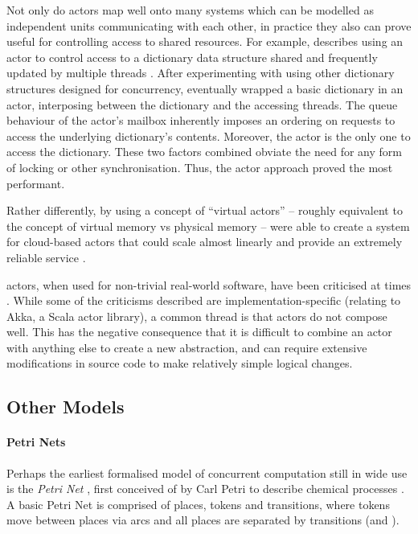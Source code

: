 Not only do \glspl{actor} map well onto many systems which can be modelled as independent units communicating with each other, in practice they also can prove useful for controlling access to shared resources.  For example, \citeauthor{Terrell2018} describes using an \gls{actor} to control access to a dictionary data structure shared and frequently updated by multiple threads \cite{Terrell2018}.  After experimenting with using other dictionary structures designed for concurrency, \citeauthor{Terrell2018} eventually wrapped a basic dictionary in an \gls{actor}, interposing between the dictionary and the accessing threads.  The queue behaviour of the \gls{actor}'s mailbox inherently imposes an ordering on requests to access the underlying dictionary's contents.   Moreover, the \gls{actor} is the only one to access the dictionary.  These two factors combined obviate the need for any form of locking or other synchronisation.  Thus, the \gls{actor} approach proved the most performant.

Rather differently, by using a concept of ``virtual actors'' -- roughly equivalent to the concept of virtual memory vs physical memory -- \citeauthor{Bernstein2016} were able to create a system for cloud-based actors that could scale almost linearly and provide an extremely reliable service \cite{Bernstein2016}.

\Glspl{actor}, when used for non-trivial real-world software, have been criticised at times \eg{} \cite{Welsh2013,Stucchio2013}.  While some of the criticisms described are implementation-specific (relating to Akka, a Scala \gls{actor} library), a common thread is that \glspl{actor} do not compose well.  This has the negative consequence that it is difficult to combine an \gls{actor} with anything else to create a new abstraction, and can require extensive modifications in source code to make relatively simple logical changes.

\subsection{\label{sec:lr:othermodels}Other Models}

\paragraph{Petri Nets}
Perhaps the earliest formalised model of concurrent computation still in wide use is the \emph{Petri Net} \cite{Dennis2011}, first conceived of by Carl Petri to describe chemical processes \cite{Petri2008}.  A basic Petri Net is comprised of places, tokens and transitions, where tokens move between places via arcs and all places are separated by transitions (and \viceversa).

